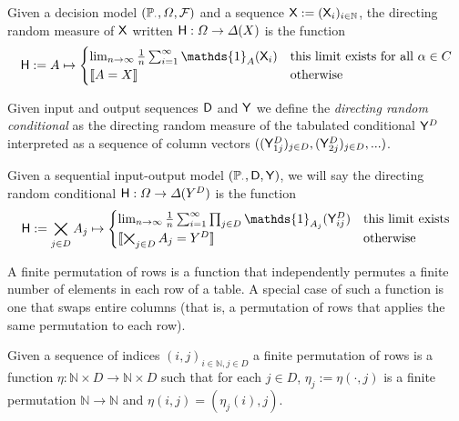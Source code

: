\begin{definition}\label{def:dir_rand_meas}
Given a decision model $(\mathbb{P}_\cdot,\Omega,\mathcal{F})$ and a sequence $\mathsf{X}:=(\mathsf{X}_i)_{i\in\mathbb{N}}$, the directing random measure of $\mathsf{X}$ written $\mathsf{H}:\Omega\to \Delta(X)$ is the function
\begin{align}
    \RV{H} := A \mapsto \begin{cases}
    \lim_{n\to \infty}\frac{1}{n} \sum_{i=1}^{\infty} \mathds{1}_{A}(\RV{X}_{i}) & \text{this limit exists for all }\alpha\in C\\
    \llbracket A = X \rrbracket &\text{otherwise}
    \end{cases} 
\end{align}
\end{definition}

Given input and output sequences $\mathsf{D}$ and $\mathsf{Y}$ we define the \emph{directing random conditional} as the directing random measure of the tabulated conditional $\mathsf{Y}^D$ interpreted as a sequence of column vectors $((\mathsf{Y}^D_{1j})_{j\in D},(\mathsf{Y}^D_{2j})_{j\in D},...)$.

\begin{definition}\label{def:dir_rand_cond}
Given a sequential input-output model $(\mathbb{P}_\cdot,\mathsf{D},\mathsf{Y})$, we will say the directing random conditional $\mathsf{H}:\Omega\to \Delta(Y^D)$ is the function
\begin{align}
    \RV{H} := \bigtimes_{j\in D} A_j \mapsto \begin{cases}
    \lim_{n\to \infty}\frac{1}{n} \sum_{i=1}^{\infty} \prod_{j\in D} \mathds{1}_{A_j}(\RV{Y}^D_{ij}) & \text{this limit exists}\\
    \llbracket \bigtimes_{j\in D} A_j = Y^D \rrbracket &\text{otherwise}
    \end{cases} 
\end{align}
\end{definition}

A finite permutation of rows is a function that independently permutes a finite number of elements in each row of a table. A special case of such a function is one that swaps entire columns (that is, a permutation of rows that applies the same permutation to each row).

\begin{definition}
Given a sequence of indices $(i,j)_{i\in \mathbb{N},j\in D}$ a finite permutation of rows is a function $\eta:\mathbb{N}\times D\to \mathbb{N}\times D$ such that for each $j\in D$, $\eta_j:=\eta(\cdot,j)$ is a finite permutation $\mathbb{N}\to \mathbb{N}$ and $\eta(i,j)=(\eta_j(i),j)$.
\end{definition}

